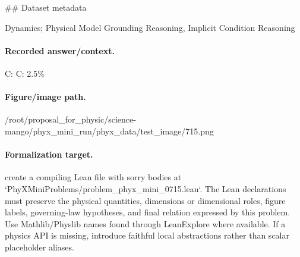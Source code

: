 \#\# Dataset metadata

Dynamics; Physical Model Grounding Reasoning, Implicit Condition Reasoning

\paragraph{Recorded answer/context.}
C: C: 2.5\%

\paragraph{Figure/image path.}
/root/proposal\_for\_physic/science-mango/phyx\_mini\_run/phyx\_data/test\_image/715.png

\paragraph{Formalization target.}
create a compiling Lean file with sorry bodies at `PhyXMiniProblems/problem\_phyx\_mini\_0715.lean`. The Lean declarations must preserve the physical quantities, dimensions or dimensional roles, figure labels, governing-law hypotheses, and final relation expressed by this problem.
Use Mathlib/Physlib names found through LeanExplore where available. If a physics API is missing, introduce faithful local abstractions rather than scalar placeholder aliases.

